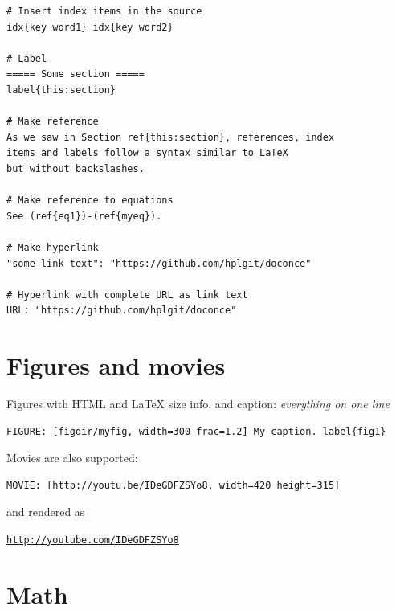 \documentclass[%
twoside,                 %
final,                   %
chapterprefix=true,      %
open=right               %
10pt]{book}
\newenvironment{doconce:movie}{}{}
\newcounter{doconce:movie:counter}
\newenvironment{graybox1admon}[1][]{
\begin{graybox1mdframed}[frametitle=#1]
}
{
\end{graybox1mdframed}
}
\newcounter{doconce:exercise:counter}
\begin{document}
\begin{Verbatim}[numbers=none,fontsize=\fontsize{9pt}{9pt},baselinestretch=0.95]
# Insert index items in the source
idx{key word1} idx{key word2}

# Label
===== Some section =====
label{this:section}

# Make reference
As we saw in Section ref{this:section}, references, index
items and labels follow a syntax similar to LaTeX
but without backslashes.

# Make reference to equations
See (ref{eq1})-(ref{myeq}).

# Make hyperlink
"some link text": "https://github.com/hplgit/doconce"

# Hyperlink with complete URL as link text
URL: "https://github.com/hplgit/doconce"
\end{Verbatim}

\section*{Figures and movies}


\begin{graybox1admon}[Important:]
Figures with HTML and {\LaTeX} size info, and caption: \emph{everything on one line}
\end{graybox1admon}



\begin{Verbatim}[numbers=none,fontsize=\fontsize{9pt}{9pt},baselinestretch=0.95]
FIGURE: [figdir/myfig, width=300 frac=1.2] My caption. label{fig1}
\end{Verbatim}

Movies are also supported:

\begin{Verbatim}[numbers=none,fontsize=\fontsize{9pt}{9pt},baselinestretch=0.95]
MOVIE: [http://youtu.be/IDeGDFZSYo8, width=420 height=315]
\end{Verbatim}
and rendered as


\begin{doconce:movie}
\begin{center}
\href{{http://youtube.com/IDeGDFZSYo8}}{\nolinkurl{http://youtube.com/IDeGDFZSYo8}}
\end{center}
\end{doconce:movie}


\section*{Math}
\end{document}

